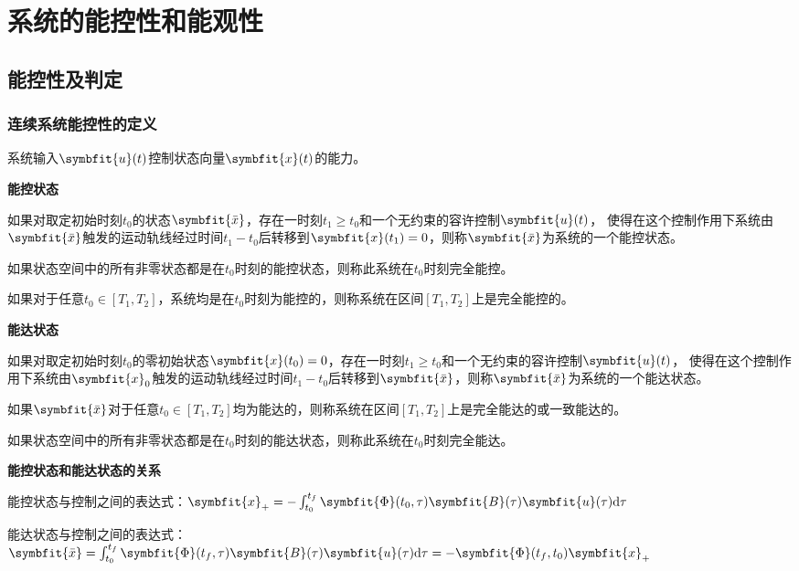 \documentclass[11pt,a4paper]{ctexart}
\renewcommand{\d}{{\rm d}}
\newcommand{\bm}{\symbfit}
\begin{document}
\section{系统的能控性和能观性}
    \subsection{能控性及判定}
        \subsubsection{连续系统能控性的定义}
            系统输入$\bm{u}(t)$控制状态向量$\bm{x}(t)$的能力。

            {\setlength{\parindent}{0pt}\textbf{能控状态}}

            如果对取定初始时刻$t_0$的状态$\bm{\bar x}$，存在一时刻$t_1\geqslant t_0$和一个无约束的容许控制$\bm{u}(t)$，
            使得在这个控制作用下系统由$\bm{\bar x}$触发的运动轨线经过时间$t_1-t_0$后转移到$\bm{x}(t_1)=0$，则称$\bm{\bar x}$为系统的一个能控状态。

            如果状态空间中的所有非零状态都是在$t_0$时刻的能控状态，则称此系统在$t_0$时刻完全能控。
            
            如果对于任意$t_0\in[T_1,T_2]$，系统均是在$t_0$时刻为能控的，则称系统在区间$[T_1,T_2]$上是完全能控的。

            {\setlength{\parindent}{0pt}\textbf{能达状态}}

            如果对取定初始时刻$t_0$的零初始状态$\bm{x}(t_0)=0$，存在一时刻$t_1\geqslant t_0$和一个无约束的容许控制$\bm{u}(t)$，
            使得在这个控制作用下系统由$\bm{x}_0$触发的运动轨线经过时间$t_1-t_0$后转移到$\bm{\bar x}$，则称$\bm{\bar x}$为系统的一个能达状态。

            如果$\bm{\bar x}$对于任意$t_0\in[T_1,T_2]$均为能达的，则称系统在区间$[T_1,T_2]$上是完全能达的或一致能达的。

            如果状态空间中的所有非零状态都是在$t_0$时刻的能达状态，则称此系统在$t_0$时刻完全能达。

            {\setlength{\parindent}{0pt}\textbf{能控状态和能达状态的关系}}
                
            能控状态与控制之间的表达式：$\bm{x}_{+}=-\int_{t_0}^{t_f}\bm{\Phi}(t_0,\tau)\bm{B}(\tau)\bm{u}(\tau)\d\tau$

            能达状态与控制之间的表达式：$\bm{\bar x}=\int_{t_0}^{t_f}\bm{\Phi}(t_f,\tau)\bm{B}(\tau)\bm{u}(\tau)\d\tau=-\bm{\Phi}(t_f,t_0)\bm{x}_{+}$
\end{document}
